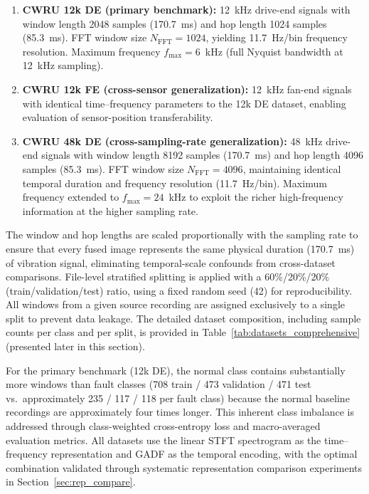 \documentclass[journal]{IEEEtran}
\begin{document}
\begin{enumerate}
\item \textbf{CWRU 12k DE (primary benchmark):} 12~kHz drive-end signals with window length 2048 samples (170.7~ms) and hop length 1024 samples (85.3~ms). FFT window size $N_{\text{FFT}}=1024$, yielding 11.7~Hz/bin frequency resolution. Maximum frequency $f_{\max}=6$~kHz (full Nyquist bandwidth at 12~kHz sampling).
\item \textbf{CWRU 12k FE (cross-sensor generalization):} 12~kHz fan-end signals with identical time--frequency parameters to the 12k DE dataset, enabling evaluation of sensor-position transferability.
\item \textbf{CWRU 48k DE (cross-sampling-rate generalization):} 48~kHz drive-end signals with window length 8192 samples (170.7~ms) and hop length 4096 samples (85.3~ms). FFT window size $N_{\text{FFT}}=4096$, maintaining identical temporal duration and frequency resolution (11.7~Hz/bin). Maximum frequency extended to $f_{\max}=24$~kHz to exploit the richer high-frequency information at the higher sampling rate.
\end{enumerate}

The window and hop lengths are scaled proportionally with the sampling rate to ensure that every fused image represents the same physical duration (170.7~ms) of vibration signal, eliminating temporal-scale confounds from cross-dataset comparisons. File-level stratified splitting is applied with a 60\%/20\%/20\% (train/validation/test) ratio, using a fixed random seed (42) for reproducibility. All windows from a given source recording are assigned exclusively to a single split to prevent data leakage. The detailed dataset composition, including sample counts per class and per split, is provided in Table~\ref{tab:datasets_comprehensive} (presented later in this section).

For the primary benchmark (12k DE), the normal class contains substantially more windows than fault classes (708 train / 473 validation / 471 test vs.\ approximately 235 / 117 / 118 per fault class) because the normal baseline recordings are approximately four times longer. This inherent class imbalance is addressed through class-weighted cross-entropy loss and macro-averaged evaluation metrics. All datasets use the linear STFT spectrogram as the time--frequency representation and GADF as the temporal encoding, with the optimal combination validated through systematic representation comparison experiments in Section~\ref{sec:rep_compare}.
\end{document}
